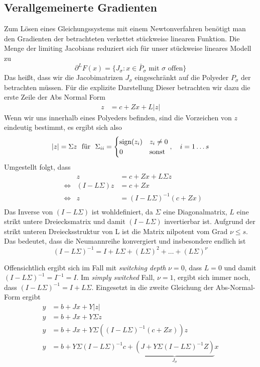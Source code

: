 \subsection{Verallgemeinerte Gradienten}

Zum Lösen eines Gleichungssystems mit einem Newtonverfahren benötigt man den Gradienten der betrachteten verkettet stückweise linearen Funktion. 
Die Menge der limiting Jacobians reduziert sich für unser stückweise lineares Modell zu 
\[
 \partial^L F(x) = \lbrace J_\sigma: x\in \bar P_\sigma \text{ mit }\sigma \text{ offen} \rbrace
\]
Das heißt, dass wir die Jacobimatrizen $J_\sigma$ eingeschränkt auf die Polyeder $P_\sigma$ der betrachten müssen.
Für die explizite Darstellung Dieser betrachten wir dazu die erste Zeile der Abs Normal Form
\begin{align*}
	z &= c+ Zx + L|z|
\end{align*}
Wenn wir uns innerhalb eines Polyeders befinden, sind die Vorzeichen von $z$ eindeutig bestimmt, es ergibt sich also  
\begin{align*}
|z| = \Sigma z~ \text{ für }~\Sigma_{ii} =\begin{cases} 
\text{sign}(z_i) & z_i\neq 0\\
0 & \text{sonst}
 \end{cases},\quad i=1\ldots s
\end{align*}
Umgestellt folgt, dass 
\begin{align*}
&&z &= c+ Zx + L\Sigma z\\
&\iff & (I-L\Sigma)z &= c+ Zx \\
&\iff & z &= (I-L\Sigma)^{-1}(c+ Zx)\\
\end{align*}
Das Inverse von $(I-L\Sigma)$ ist wohldefiniert, da $\Sigma$ eine Diagonalmatrix, $L$ eine strikt untere Dreiecksmatrix und damit $(I-L\Sigma)$ invertierbar ist. 
Aufgrund der strikt unteren Dreiecksstruktur von L ist die Matrix nilpotent vom Grad $\nu\leq s$. Das bedeutet, dass die Neumannreihe konvergiert und insbesondere endlich ist
\[
(I-L\Sigma)^{-1} = I+L\Sigma + (L\Sigma)^2 + \ldots + (L\Sigma)^{\nu}
\] 

Offensichtlich ergibt sich im Fall mit \textit{switching depth} $\nu = 0$, dass $L=0$ und damit $(I-L\Sigma)^{-1} = I^{-1} = I$. Im \textit{simply switched} Fall, $\nu=1$, ergibt sich immer noch, dass $(I-L\Sigma)^{-1} =I+L\Sigma$.
Eingesetzt in die zweite Gleichung der Abs-Normal-Form ergibt
\begin{align*}
y &= b+Jx + Y|z|\\
y &= b+Jx + Y\Sigma z\\
y &= b+ Jx + Y\Sigma ((I-L\Sigma)^{-1}(c+ Zx))z\\
y &= b + Y\Sigma(I-L\Sigma)^{-1}c+\underbrace{(J+Y\Sigma(I-L\Sigma)^{-1}Z)}_{J_\sigma}x \\
\end{align*}

